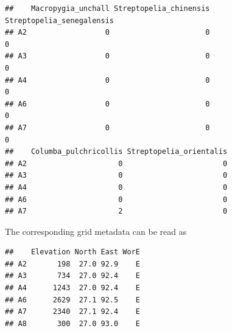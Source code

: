 \documentclass[12pt]{article}
\begin{document}
\begin{knitrout}
\color{fgcolor}\begin{kframe}
\begin{alltt}
 \hlkwb{<-} \hlstd{(}\hlstd{(}\hlstd{(}\hlstd{,} \hlstd{,}
                              \hlstd{=} \hlstd{)))}
 \hlkwb{<-} \hlstd{(}
\hlstd{taxonomic_counts[}\hlopt{:}\hlstd{,}\hlopt{:}\hlstd{]}
\end{alltt}
\begin{verbatim}
##    Macropygia_unchall Streptopelia_chinensis Streptopelia_senegalensis
## A2                  0                      0                         0
## A3                  0                      0                         0
## A4                  0                      0                         0
## A6                  0                      0                         0
## A7                  0                      0                         0
##    Columba_pulchricollis Streptopelia_orientalis
## A2                     0                       0
## A3                     0                       0
## A4                     0                       0
## A6                     0                       0
## A7                     2                       0
\end{verbatim}
\end{kframe}
\end{knitrout}


The corresponding grid metadata can be read as

\begin{knitrout}
\color{fgcolor}\begin{kframe}
\begin{alltt}
 \hlkwb{<-} \hlstd{(}
\end{alltt}
\begin{verbatim}
##    Elevation North East WorE
## A2       198  27.0 92.9    E
## A3       734  27.0 92.4    E
## A4      1243  27.0 92.4    E
## A6      2629  27.1 92.5    E
## A7      2340  27.1 92.4    E
## A8       300  27.0 93.0    E
\end{verbatim}
\end{kframe}
\end{knitrout}
\end{document}
